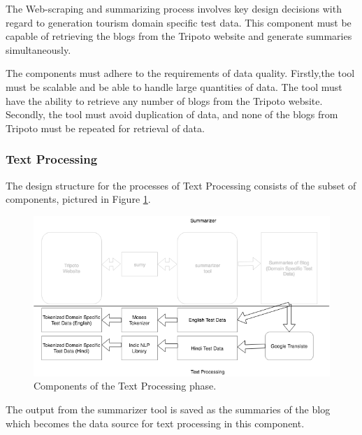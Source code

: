 The Web-scraping and summarizing process involves key design decisions with regard to generation tourism domain specific test data. This component must be capable of retrieving the blogs from the Tripoto website and generate summaries simultaneously. 

The components must adhere to the requirements of data quality. Firstly,the tool must be scalable and be able to handle large quantities of data. The tool must have the ability to retrieve any number of blogs from the Tripoto website. Secondly, the tool must avoid duplication of data, and none of the blogs from Tripoto must be repeated for retrieval of data.

\subsubsection{Text Processing}
The design structure for the processes of Text Processing consists of the subset of components, pictured in Figure \ref{summarizer3}.

\begin{figure}[h]
\includegraphics[width=\textwidth]{figures/design6.png}
\caption{Components of the Text Processing phase.} \label{summarizer3}
\end{figure}

The output from the summarizer tool is saved as the summaries of the blog which becomes the data source for text processing in this component. 

